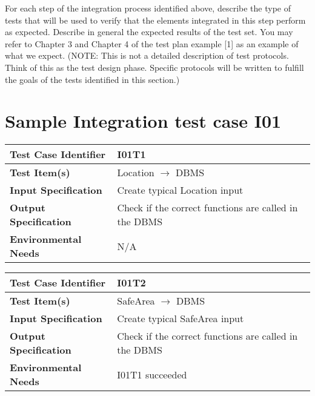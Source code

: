 For each step of the integration process identified above, describe the type of tests that will be used to verify that the elements integrated in this step perform as expected. Describe in general the expected results of the test set. You may refer to Chapter 3 and Chapter 4 of the test plan example [1] as an example of what we expect.
(NOTE: This is not a detailed description of test protocols. Think of this as the test design phase. Specific protocols will be written to fulfill the goals of the tests identified in this section.)

\section{Sample Integration test case I01}\label{I01}
\begin{center}
	\vspace{0.6cm}
	\begin{tabular}{|l|l|}
		\hline
		\textbf{Test Case Identifier} & I01T1 \bigstrut \\\hline
		\textbf{Test Item(s)} & Location \ensuremath{\rightarrow} DBMS \bigstrut \\\hline
		\textbf{Input Specification} & Create typical Location input \bigstrut \\\hline
		\textbf{Output Specification} & Check if the correct functions are called in the DBMS \bigstrut \\\hline
		\textbf{Environmental Needs} & N/A \bigstrut \\\hline
	\end{tabular}
\end{center}

\begin{center}
	\vspace{0.6cm}
	\begin{tabular}{|l|l|}
		\hline
		\textbf{Test Case Identifier} & I01T2 \bigstrut \\\hline
		\textbf{Test Item(s)} & SafeArea \ensuremath{\rightarrow} DBMS \bigstrut \\\hline
		\textbf{Input Specification} & Create typical SafeArea input \bigstrut \\\hline
		\textbf{Output Specification} & Check if the correct functions are called in the DBMS \bigstrut \\\hline
		\textbf{Environmental Needs} & I01T1 succeeded\bigstrut \\\hline
	\end{tabular}
\end{center}

